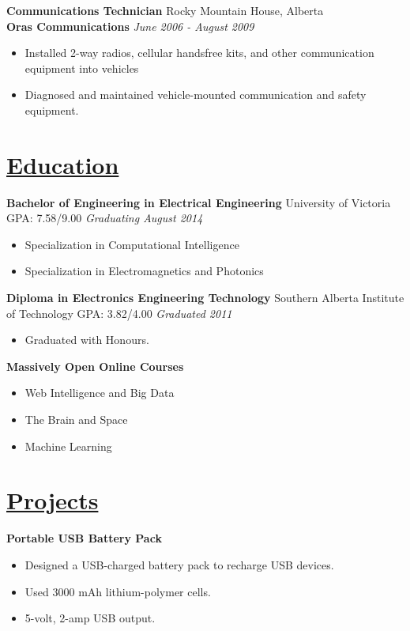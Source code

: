 \documentclass[a4paper, 11pt]{article}
\begin{document}
  \textbf{Communications Technician}
  \hfill
  Rocky Mountain House, Alberta \\
  \textbf{Oras Communications}
  \hfill
  \emph{June 2006 - August 2009}
  \begin{itemize}[nosep]
  \item Installed 2-way radios, cellular handsfree kits, and other communication equipment into vehicles
  \item Diagnosed and maintained vehicle-mounted communication and safety equipment.
  \end{itemize}  

\section{\underline{Education}}
  \textbf{Bachelor of Engineering in Electrical Engineering}
  \hfill
  University of Victoria\\
  GPA: 7.58/9.00
  \hfill
  \emph{Graduating August 2014}
  \begin{itemize}[nosep]
    \item Specialization in Computational Intelligence
    \item Specialization in Electromagnetics and Photonics
  \end{itemize}
  \medskip
  
  \textbf{Diploma in Electronics Engineering Technology}
  \hfill
  Southern Alberta Institute of Technology
  GPA: 3.82/4.00
  \hfill
  \emph{Graduated 2011}
  \begin{itemize}[nosep]
    \item Graduated with Honours.
  \end{itemize}
  \medskip
  
  \textbf{Massively Open Online Courses}
  \begin{itemize}[nosep]
    \item Web Intelligence and Big Data
    \item The Brain and Space
    \item Machine Learning
  \end{itemize}
  
\section{\underline{Projects}}
  \textbf{Portable USB Battery Pack}
  \begin{itemize}[nosep]
    \item Designed a USB-charged battery pack to recharge USB devices.
    \item Used 3000 mAh lithium-polymer cells.
    \item 5-volt, 2-amp USB output.
  \end{itemize}
  \medskip
\end{document}

